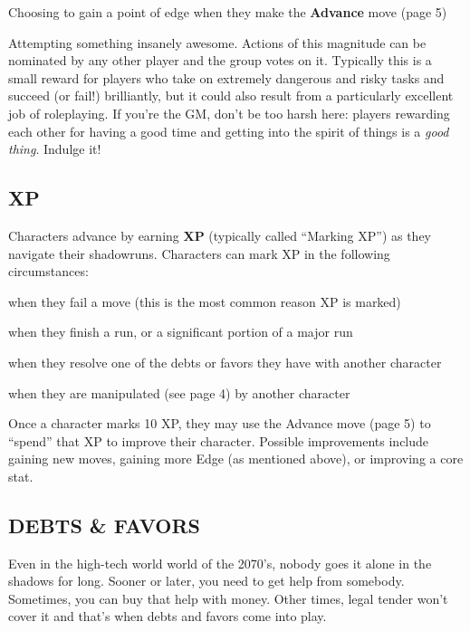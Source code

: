 \documentclass[oneside,10pt]{article}
\begin{document}
\begin{multicols}{2}
\begin{dent}
  \tcirc{} Choosing to gain a point of edge when they make the
  \textbf{Advance} move (page 5)
  
\tcirc{} Attempting something insanely awesome. Actions of this
magnitude can be nominated by any other player and the group votes on
it. Typically this is a small reward for players who take on extremely
dangerous and risky tasks and succeed (or fail!)  brilliantly, but it
could also result from a particularly excellent job of roleplaying. If
you’re the GM, don’t be too harsh here: players rewarding each other
for having a good time and getting into the spirit of things is a
\textit{good thing}. Indulge it!

\end{dent}



\subsection{XP}
\label{stat_xp}
Characters advance by earning \textbf{XP} (typically called ``Marking
XP'') as they navigate their shadowruns. Characters can mark
XP in the following circumstances:

\begin{dent}
\tcirc{} when they fail a move (this is the most common reason
XP is marked)

\tcirc{} when they finish a run, or a significant portion of a major
run

\tcirc{} when they resolve one of the debts or
favors they have with another character

\tcirc{} when they are manipulated (see page 4) by another
character
\end{dent}

Once a character marks 10 XP, they may use the Advance
move (page 5) to ``spend'' that XP to improve their character.
Possible improvements include gaining new moves, gaining
more Edge (as mentioned above), or improving a core stat.

\subsection{DEBTS \& FAVORS}
\label{debtsfavors}
Even in the high-tech world world of the 2070’s, nobody
goes it alone in the shadows for long. Sooner or later, you
need to get help from somebody. Sometimes, you can buy
that help with money. Other times, legal tender won’t cover
it and that’s when debts and favors come into
play.


\end{multicols}
\end{document}

